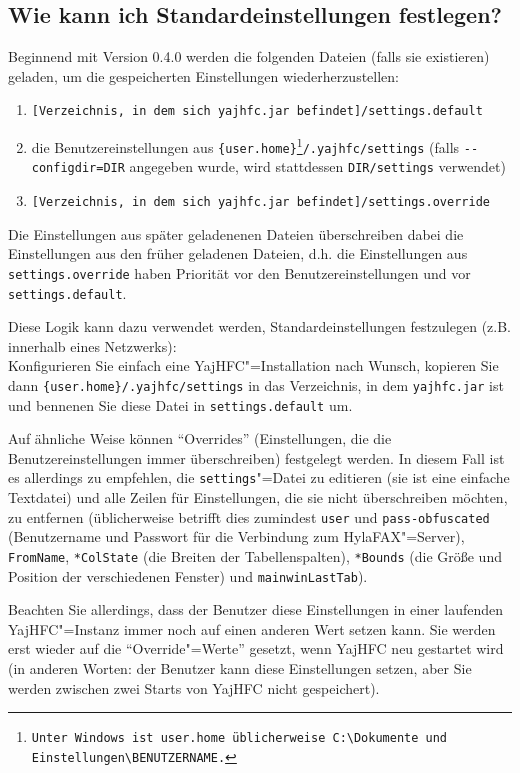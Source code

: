 \documentclass[a4paper,10pt,halfparskip,noparindent]{scrartcl}
\begin{document}
\subsection{Wie kann ich Standardeinstellungen festlegen?}

Beginnend mit Version 0.4.0 werden die folgenden Dateien (falls sie existieren) geladen, um die gespeicherten Einstellungen wiederherzustellen:
\begin{enumerate}
 \item \texttt{[Verzeichnis, in dem sich yajhfc.jar befindet]/settings.default}
 \item die Benutzereinstellungen aus \texttt{\{user.home\}\footnote{Unter Windows ist \texttt{user.home} üblicherweise \texttt{C:\textbackslash Dokumente und Einstellungen\textbackslash BENUTZERNAME}.}/.yajhfc/settings} (falls \texttt{-{-}configdir=DIR} angegeben wurde, wird stattdessen \texttt{DIR/settings} verwendet)
 \item \texttt{[Verzeichnis, in dem sich yajhfc.jar befindet]/settings.override}
\end{enumerate}

Die Einstellungen aus später geladenenen Dateien überschreiben dabei die Einstellungen aus den früher geladenen Dateien, d.h. die Einstellungen aus \texttt{settings.override} haben Priorität vor den Benutzereinstellungen und vor \texttt{settings.default}.
\medskip

Diese Logik kann dazu verwendet werden, Standardeinstellungen festzulegen (z.B. innerhalb eines Netzwerks):\\
Konfigurieren Sie einfach eine YajHFC"=Installation nach Wunsch, kopieren Sie dann \texttt{\{user.home\}/.yajhfc/settings} in das Verzeichnis, in dem \texttt{yajhfc.jar} ist und bennenen Sie diese Datei in \texttt{settings.default} um.
\medskip

Auf ähnliche Weise können "`Overrides"' (Einstellungen, die die Benutzereinstellungen immer überschreiben) festgelegt werden. In diesem Fall ist es allerdings zu empfehlen, die \texttt{settings}"=Datei zu editieren (sie ist eine einfache Textdatei) und alle Zeilen für Einstellungen, die sie nicht überschreiben möchten, zu entfernen (üblicherweise betrifft dies zumindest \texttt{user} und \texttt{pass-obfuscated} (Benutzername und Passwort für die Verbindung zum HylaFAX"=Server), \texttt{FromName}, \texttt{*ColState} (die Breiten der Tabellenspalten), \texttt{*Bounds} (die Größe und Position der verschiedenen Fenster) und \texttt{mainwinLastTab}).

Beachten Sie allerdings, dass der Benutzer diese Einstellungen in einer laufenden YajHFC"=Instanz immer noch auf einen anderen Wert setzen kann. Sie werden erst wieder auf die "`Override"=Werte"' gesetzt, wenn YajHFC neu gestartet wird (in anderen Worten: der Benutzer kann diese Einstellungen setzen, aber Sie werden zwischen zwei Starts von YajHFC nicht gespeichert).
\end{document}

